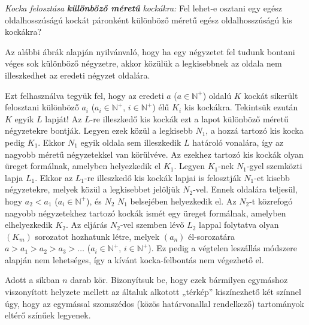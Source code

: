 \begin{problem}
\emph{Kocka felosztása }\textbf{\emph{különböző méretű}}\emph{
kockákra:} Fel lehet-e osztani egy egész oldalhosszúságú kockát páronként
különböző méretű egész oldalhosszúságú kis kockákra? 
\end{problem}

\begin{solution}
Az alábbi ábrák alapján nyilvánvaló, hogy ha egy négyzetet fel tudunk
bontani véges sok különböző négyzetre, akkor közülük a legkisebbnek
az oldala nem illeszkedhet az eredeti négyzet oldalára.
\begin{center}
\par\end{center}
Ezt felhasználva tegyük fel, hogy az eredeti $a$ ($a\in\mathbb{N}^{+}$)
oldalú $K$ kockát sikerült felosztani különböző $a_{i}$ ($a_{i}\in\mathbb{N}^{+}$,
$i\in\mathbb{N}^{+}$) élű $K_{i}$ kis kockákra. Tekintsük ezután
$K$ egyik $L$ lapját! Az $L$-re illeszkedő kis kockák ezt a lapot
különböző méretű négyzetekre bontják. Legyen ezek közül a legkisebb
$N_{1}$, a hozzá tartozó kis kocka pedig $K_{1}$. Ekkor $N_{1}$
egyik oldala sem illeszkedik $L$ határoló vonalára, így az nagyobb
méretű négyzetekkel van körülvéve. Az ezekhez tartozó kis kockák olyan
üreget formálnak, amelyben helyezkedik el $K_{1}$. Legyen $K_{1}$-nek
$N_{1}$-gyel szemközti lapja $L_{1}$. Ekkor az $L_{1}$-re illeszkedő
kis kockák lapjai is felosztják $N_{1}$-et kisebb négyzetekre, melyek
közül a legkisebbet jelöljük $N_{2}$-vel. Ennek oldalára teljesül,
hogy $a_{2}<a_{1}$ ($a_{i}\in\mathbb{N}^{+}$), és $N_{2}$ $N_{1}$
belsejében helyezkedik el. Az $N_{2}$-t közrefogó nagyobb négyzetekhez
tartozó kockák ismét egy üreget formálnak, amelyben elhelyezkedik
$K_{2}$. Az eljárás $N_{2}$-vel szemben lévő $L_{2}$ lappal folytatva
olyan $(K_{m})$ sorozatot hozhatunk létre, melyek $(a_{n})$ él-sorozatára
$a>a_{1}>a_{2}>a_{3}>\dots$ ($a_{i}\in\mathbb{N}^{+}$, $i\in\mathbb{N}^{+}$).
Ez pedig a végtelen leszállás módszere alapján nem lehetséges, így
a kívánt kocka-felbontás nem végezhető el. 
\end{solution}
\begin{problem}
Adott a síkban $n$ darab kör. Bizonyítsuk be, hogy ezek bármilyen
egymáshoz viszonyított helyzete mellett az általuk alkotott „térkép”
kiszínezhető két színnel úgy, hogy az egymással szomszédos (közös
határvonallal rendelkező) tartományok eltérő színűek legyenek. 
\end{problem}

